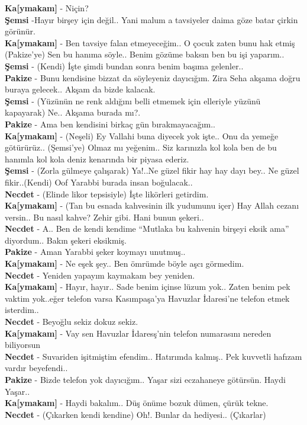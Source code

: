 \documentclass[]{book}
\begin{document}
\textbf{Ka{[}ymakam{]}} - Niçin?\\
\textbf{Şemsi} -Hayır birşey için değil.. Yani malum a tavsiyeler daima göze batar çirkin görünür.\\
\textbf{Ka{[}ymakam{]}} - Ben tavsiye falan etmeyeceğim.. O çocuk zaten bunu hak etmiş (Pakize'ye) Sen bu hanıma söyle.. Benim gözüme baksın ben bu işi yaparım..\\
\textbf{Şemsi} - (Kendi) İşte şimdi bundan sonra benim başıma gelenler..\\
\textbf{Pakize} - Bunu kendisine bizzat da söyleyeniz dayıcığım. Zira Seha akşama doğru buraya gelecek.. Akşam da bizde kalacak.\\
\textbf{Şemsi} - (Yüzünün ne renk aldığını belli etmemek için elleriyle yüzünü kapayarak) Ne.. Akşama burada mı?.\\
\textbf{Pakize} - Ama ben kendisini birkaç gün bırakmayacağım..\\
\textbf{Ka{[}ymakam{]}} - (Neşeli) Ey Vallahi buna diyecek yok işte.. Onu da yemeğe götürürüz.. (Şemsi'ye) Olmaz mı yeğenim.. Siz karınızla kol kola ben de bu hanımla kol kola deniz kenarında bir piyasa ederiz.\\
\textbf{Şemsi} - (Zorla gülmeye çalışarak) Ya!..Ne güzel fikir hay hay dayı bey.. Ne güzel fikir..(Kendi) Oof Yarabbi burada insan boğulacak..\\
\textbf{Necdet} - (Elinde likor tepsisiyle) İşte likörleri getirdim.\\
\textbf{Ka{[}ymakam{]}} - (Tan bu esnada kahvesinin ilk yudumunu içer) Hay Allah cezanı versin.. Bu nasıl kahve? Zehir gibi. Hani bunun şekeri..\\
\textbf{Necdet} - A.. Ben de kendi kendime ``Mutlaka bu kahvenin birşeyi eksik ama'' diyordum.. Bakın şekeri eksikmiş.\\
\textbf{Pakize} - Aman Yarabbi şeker koymayı unutmuş..\\
\textbf{Ka{[}ymakam{]}} - Ne eşek şey.. Ben ömrümde böyle aşcı görmedim.\\
\textbf{Necdet} - Yeniden yapayım kaymakam bey yeniden.\\
\textbf{Ka{[}ymakam{]}} - Hayır, hayır.. Sade benim içinse lüzum yok.. Zaten benim pek vaktim yok..eğer telefon varsa Kasımpaşa'ya Havuzlar İdaresi'ne telefon etmek isterdim..\\
\textbf{Necdet} - Beyoğlu sekiz dokuz sekiz.\\
\textbf{Ka{[}ymakam{]}} - Vay sen Havuzlar İdaresş'nin telefon numarasını nereden biliyorsun\\
\textbf{Necdet} - Suvariden işitmiştim efendim.. Hatırımda kalmış.. Pek kuvvetli hafızam vardır beyefendi..\\
\textbf{Pakize} - Bizde telefon yok dayıcığım.. Yaşar sizi eczahaneye götürsün. Haydi Yaşar..\\
\textbf{Ka{[}ymakam{]}} - Haydi bakalım.. Düş önüme bozuk dümen, çürük tekne.\\
\textbf{Necdet} - (Çıkarken kendi kendine) Oh!. Bunlar da hediyesi.. (Çıkarlar)
\end{document}
